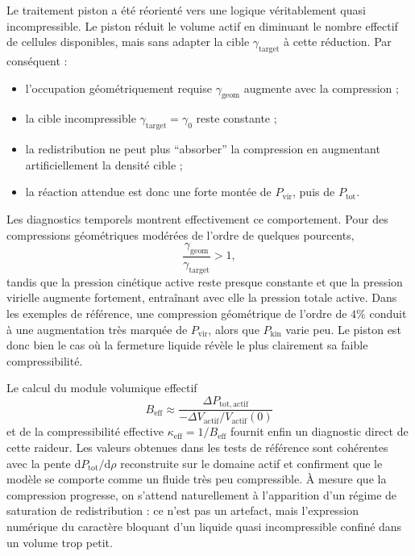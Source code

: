 \documentclass[11pt,a4paper]{article}
\begin{document}
Le traitement piston a été réorienté vers une logique véritablement quasi incompressible. Le piston réduit le volume actif en diminuant le nombre effectif de cellules disponibles, mais sans adapter la cible \(\gamma_{\mathrm{target}}\) à cette réduction. Par conséquent :
\begin{itemize}
  \item l'occupation géométriquement requise \(\gamma_{\mathrm{geom}}\) augmente avec la compression ;
  \item la cible incompressible \(\gamma_{\mathrm{target}}=\gamma_0\) reste constante ;
  \item la redistribution ne peut plus ``absorber'' la compression en augmentant artificiellement la densité cible ;
  \item la réaction attendue est donc une forte montée de \(P_{\mathrm{vir}}\), puis de \(P_{\mathrm{tot}}\).
\end{itemize}

Les diagnostics temporels montrent effectivement ce comportement. Pour des compressions géométriques modérées de l'ordre de quelques pourcents,
\begin{equation}
 \frac{\gamma_{\mathrm{geom}}}{\gamma_{\mathrm{target}}} > 1,
\end{equation}
tandis que la pression cinétique active reste presque constante et que la pression virielle augmente fortement, entraînant avec elle la pression totale active. Dans les exemples de référence, une compression géométrique de l'ordre de \(4\%\) conduit à une augmentation très marquée de \(P_{\mathrm{vir}}\), alors que \(P_{\mathrm{kin}}\) varie peu. Le piston est donc bien le cas où la fermeture liquide révèle le plus clairement sa faible compressibilité.

Le calcul du module volumique effectif
\begin{equation}
 B_{\mathrm{eff}} \approx \frac{\Delta P_{\mathrm{tot,actif}}}{-\Delta V_{\mathrm{actif}}/V_{\mathrm{actif}}(0)}
\end{equation}
et de la compressibilité effective \(\kappa_{\mathrm{eff}}=1/B_{\mathrm{eff}}\) fournit enfin un diagnostic direct de cette raideur. Les valeurs obtenues dans les tests de référence sont cohérentes avec la pente \(\mathrm d P_{\mathrm{tot}}/\mathrm d \rho\) reconstruite sur le domaine actif et confirment que le modèle se comporte comme un fluide très peu compressible. À mesure que la compression progresse, on s'attend naturellement à l'apparition d'un régime de saturation de redistribution : ce n'est pas un artefact, mais l'expression numérique du caractère bloquant d'un liquide quasi incompressible confiné dans un volume trop petit.
\end{document}
